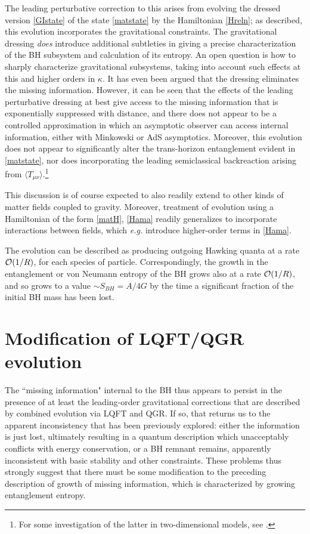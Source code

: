 \documentclass[12pt]{article}
\numberwithin{equation}{section}
\newcommand{\calo}{{\cal O}}
\begin{document}
The leading perturbative correction to this arises from evolving the dressed version \eqref{GIstate} of the state \eqref{matstate} by the Hamiltonian \eqref{Hreln}; as described, this evolution incorporates the gravitational constraints.
The gravitational dressing {\it does} introduce additional subtleties in giving a precise characterization of the BH subsystem and calculation of its entropy.
An open question is how to sharply characterize gravitational subsystems\cite{DoGi4,SGsplit,SGsub}, taking into account such effects at this and higher orders in $\kappa$.  It has even been argued that the dressing eliminates the missing information\cite{CGPR,LPRS}.  However, it can be seen that the effects of the leading perturbative dressing at best give access to the missing information that is exponentially suppressed with distance\cite{SGsub}, and there does not appear to be a controlled approximation in which an asymptotic observer can access internal information, either with Minkowski or AdS asymptotics.  Moreover, this evolution does not appear to significantly alter the trans-horizon entanglement evident in \eqref{matstate}, nor does incorporating the leading semiclassical backreaction arising from $\langle T_{\mu\nu}\rangle$.\footnote{For some investigation of the latter in two-dimensional models, see \cite{GiNe}.}   

This discussion is of course expected to also readily extend to other kinds of matter fields coupled to gravity.  Moreover, treatment of evolution using a Hamiltonian of the form  \eqref{matH}, \eqref{Hama} readily generalizes to incorporate interactions between fields, which {\it e.g.} introduce higher-order terms in \eqref{Hama}.    

The evolution can be  described as producing outgoing Hawking quanta at a rate $\calo(1/R)$, for each species of particle.  Correspondingly, the growth in the entanglement or von Neumann entropy of the BH grows also at a rate $\calo(1/R)$, and so grows to a value $\sim S_{BH}=A/4G$  by the time a significant fraction of the initial BH mass has been lost.


\section{Modification of  LQFT/QGR evolution}

The ``missing information" internal to the BH thus appears to persist in the presence of at least the leading-order gravitational corrections that are described by combined evolution via LQFT and QGR.  If so, that returns us to the apparent inconsistency that has been previously explored: either the information is just lost\cite{Hawk-incoh}, ultimately resulting in a quantum description which unacceptably conflicts with energy conservation\cite{BPS}, or a BH remnant remains, apparently inconsistent with basic stability\cite{CaWi,Pres,WABHIP} and other\cite{Susstrouble} constraints.  These problems thus strongly suggest that there must be some  modification to the preceding description of growth of missing information, which is characterized by growing entanglement entropy.
\end{document}
